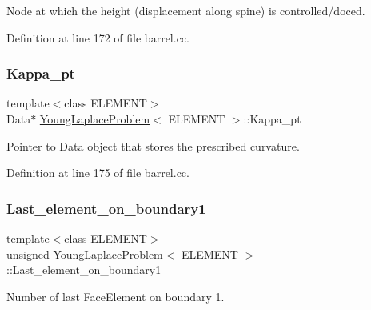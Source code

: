 Node at which the height (displacement along spine) is controlled/doced. 



Definition at line 172 of file barrel.\+cc.

\mbox{\label{classYoungLaplaceProblem_a78d1ae3b73777674003b2c9794ea9b43}} 
\subsubsection{\texorpdfstring{Kappa\+\_\+pt}{Kappa\_pt}}
{\footnotesize\ttfamily template$<$class E\+L\+E\+M\+E\+NT$>$ \\
Data$\ast$ \hyperlink{classYoungLaplaceProblem}{Young\+Laplace\+Problem}$<$ E\+L\+E\+M\+E\+NT $>$\+::Kappa\+\_\+pt\hspace{0.3cm}{\ttfamily [private]}}



Pointer to Data object that stores the prescribed curvature. 



Definition at line 175 of file barrel.\+cc.

\mbox{\label{classYoungLaplaceProblem_a30b767547f8b93461b56653dd007063a}} 
\subsubsection{\texorpdfstring{Last\+\_\+element\+\_\+on\+\_\+boundary1}{Last\_element\_on\_boundary1}}
{\footnotesize\ttfamily template$<$class E\+L\+E\+M\+E\+NT$>$ \\
unsigned \hyperlink{classYoungLaplaceProblem}{Young\+Laplace\+Problem}$<$ E\+L\+E\+M\+E\+NT $>$\+::Last\+\_\+element\+\_\+on\+\_\+boundary1\hspace{0.3cm}{\ttfamily [private]}}



Number of last Face\+Element on boundary 1. 



